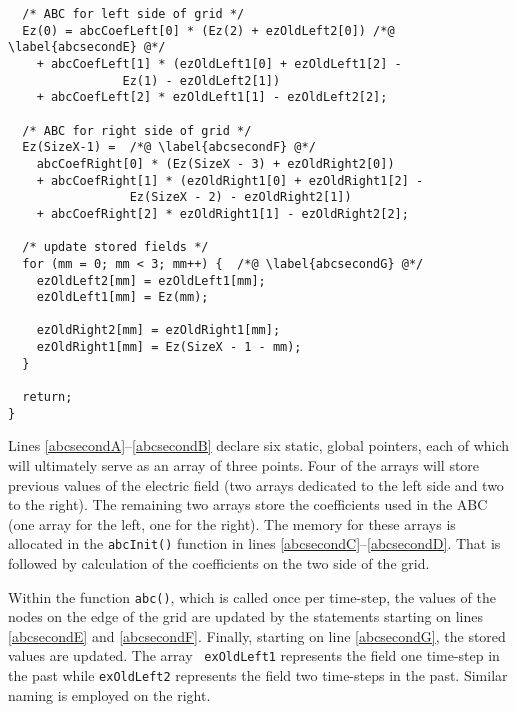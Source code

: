 \begin{program}
\begin{lstlisting}
  /* ABC for left side of grid */
  Ez(0) = abcCoefLeft[0] * (Ez(2) + ezOldLeft2[0]) /*@ \label{abcsecondE} @*/
    + abcCoefLeft[1] * (ezOldLeft1[0] + ezOldLeft1[2] -
		        Ez(1) - ezOldLeft2[1])
    + abcCoefLeft[2] * ezOldLeft1[1] - ezOldLeft2[2];

  /* ABC for right side of grid */
  Ez(SizeX-1) =  /*@ \label{abcsecondF} @*/
    abcCoefRight[0] * (Ez(SizeX - 3) + ezOldRight2[0])
    + abcCoefRight[1] * (ezOldRight1[0] + ezOldRight1[2] -
		         Ez(SizeX - 2) - ezOldRight2[1])
    + abcCoefRight[2] * ezOldRight1[1] - ezOldRight2[2];

  /* update stored fields */
  for (mm = 0; mm < 3; mm++) {  /*@ \label{abcsecondG} @*/
    ezOldLeft2[mm] = ezOldLeft1[mm];
    ezOldLeft1[mm] = Ez(mm);
    
    ezOldRight2[mm] = ezOldRight1[mm];
    ezOldRight1[mm] = Ez(SizeX - 1 - mm);
  }

  return;
}
\end{lstlisting}
\end{program}

Lines \ref{abcsecondA}--\ref{abcsecondB} declare six static, global
pointers, each of which will ultimately serve as an array of three
points.  Four of the arrays will store previous values of the electric
field (two arrays dedicated to the left side and two to the right).
The remaining two arrays store the coefficients used in the ABC (one
array for the left, one for the right).  The memory for these arrays
is allocated in the {\tt abcInit()} function in lines
\ref{abcsecondC}--\ref{abcsecondD}.  That is followed by calculation
of the coefficients on the two side of the grid.

Within the function {\tt abc()}, which is called once per time-step,
the values of the nodes on the edge of the grid are updated by the
statements starting on lines
\ref{abcsecondE} and \ref{abcsecondF}.  Finally, starting on line
\ref{abcsecondG}, the stored values are updated.  The array {\tt
exOldLeft1} represents the field one time-step in the past while 
{\tt exOldLeft2} represents the field two time-steps in the past.
Similar naming is employed on the right.
